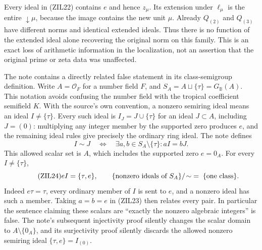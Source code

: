 Every ideal in (ZIL22) contains $e$ and hence $z_\mu$.
Its extension under $\ell_\mu$ is the entire $\downarrow\mu$,
because the image contains the new unit $\mu$.
Already $Q_{(2)}$ and $Q_{(3)}$ have different norms and identical
extended ideals. Thus there is no function of the extended ideal
alone recovering the original norm on this family. This is an
exact loss of arithmetic information in the localization, not
an assertion that the original prime or zeta data was unaffected.

The note contains a directly related false statement in its
class-semigroup definition. Write $A=\mathcal O_F$ for a number
field $F$, and $S_A=A\sqcup\{\tau\}=G_{\mathbb B}(A)$.
This notation avoids confusing the number field with the tropical
coefficient semifield $K$. With the source's own convention,
a nonzero semiring ideal means an ideal $I\ne\{\tau\}$.
Every such ideal is $I_J=J\cup\{\tau\}$ for an ideal
$J\subset A$, including $J=(0)$: multiplying any integer
member by the supported zero produces $e$, and the remaining
ideal rules give precisely the ordinary ring ideal. The note
defines
\begin{equation}\tag{ZIL23}
 I\sim J\quad\Longleftrightarrow\quad
 \exists a,b\in S_A\setminus\{\tau\}:aI=bJ.
\end{equation}
This allowed scalar set is $A$, which includes the supported
zero $e=0_A$. For every $I\ne\{\tau\}$,
\begin{equation}\tag{ZIL24}
 eI=\{\tau,e\},\qquad
 \{\hbox{nonzero ideals of }S_A\}/\!\sim
       \;=\;\{\hbox{one class}\}.
\end{equation}
Indeed $e\tau=\tau$, every ordinary member of $I$ is sent
to $e$, and a nonzero ideal has such a member. Taking $a=b=e$
in (ZIL23) then relates every pair. In particular the sentence
claiming these scalars are ``exactly the nonzero algebraic
integers'' is false. The note's subsequent injectivity proof
silently changes the scalar domain to $A\setminus\{0_A\}$,
and its surjectivity proof silently discards the allowed
nonzero semiring ideal $\{\tau,e\}=I_{(0)}$.

